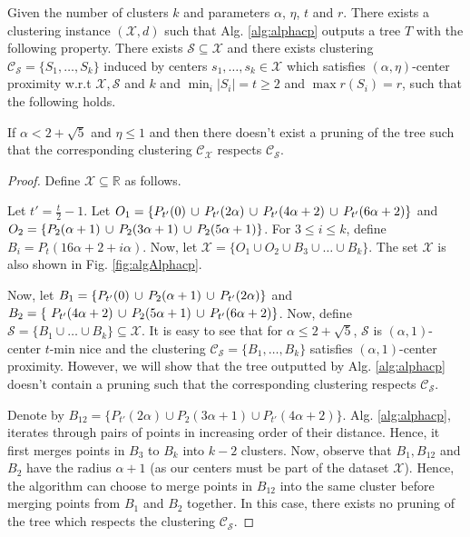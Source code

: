 \documentclass[anon,12pt]{colt2016} %
\newcommand{\mc}{\mathcal}
\begin{document}
\begin{theorem}
\label{thm:algAlphacp}
Given the number of clusters $k$ and parameters $\alpha$, $\eta$, $t$ and $r$. There exists a clustering instance $(\mc X, d)$ such that Alg. \ref{alg:alphacp} outputs a tree $T$ with the following property. There exists $\mc S \subseteq \mc X$ and there exists clustering $\mc C_{\mc S} = \{S_1, \ldots, S_k\}$ induced by centers $s_1, \ldots, s_k \in \mc X$ which satisfies $(\alpha, \eta)$-center proximity w.r.t $\mc X, \mc S$ and $k$ and $ \min_i|S_i| = t \ge 2$ and $\max r(S_i) = r$, such that the following holds. 

If $\alpha < 2 + \sqrt 5$ and $\eta \le 1$ and then there doesn't exist a pruning of the tree such that the corresponding clustering $\mc C_{\mc X}$ respects $\mc C_{\mc S}$.
\end{theorem}

\begin{proof}
Define $\mc X \subseteq \mathbb{R}$ as follows. 

Let $t' = \frac{t}{2}-1$. Let $O_1 = \{P_{t'}(0) \thinspace\cup\thinspace P_{t'}(2\alpha) \thinspace\cup\thinspace P_{t'}(4\alpha+2) \thinspace\cup\thinspace P_{t'}(6\alpha+2)\}$ and $O_2 = \{P_{2}(\alpha+1) \thinspace\cup\thinspace P_{2}(3\alpha+1) \thinspace\cup\thinspace P_{2}(5\alpha+1) \}$. For $3\le i\le k$, define $B_i = P_t (16\alpha+2+i \alpha )$. Now, let $\mc X = \{ O_1 \cup O_2 \cup B_3 \cup \ldots \cup B_k \}$. The set $\mc X$ is also shown in Fig. \ref{fig:algAlphacp}.

Now, let $B_1 = \{P_{t'}(0) \thinspace\cup\thinspace  P_{2}(\alpha+1) \thinspace\cup\thinspace P_{t'}(2\alpha) \}$ and $B_2 = \{\ P_{t'}(4\alpha+2) \thinspace\cup\thinspace P_{2}(5\alpha+1)\thinspace\cup\thinspace P_{t'}(6\alpha+2)\}$. Now, define $\mc S = \{B_1 \cup \ldots \cup B_k\} \subseteq \mc X$. It is easy to see that for $\alpha \le 2+\sqrt{5}$, $\mc S$ is $(\alpha, 1)$-center $t$-min nice and the clustering $\mc C_{\mc S} = \{B_1, \ldots, B_k\}$ satisfies $(\alpha, 1)$-center proximity. However, we will show that the tree outputted by Alg. \ref{alg:alphacp} doesn't contain a pruning such that the corresponding clustering respects $\mc C_{\mc S}$.

Denote by $B_{12} = \{P_{t'}(2\alpha) \cup P_{2}(3\alpha+1) \cup P_{t'}(4\alpha+2) \}$. Alg. \ref{alg:alphacp}, iterates through pairs of points in increasing order of their distance. Hence, it first merges points in $B_3$ to $B_k$ into $k-2$ clusters. Now, observe that $B_1, B_{12}$ and $B_{2}$ have the radius $\alpha + 1$ (as our centers must be part of the dataset $\mc X$). Hence, the algorithm can choose to merge points in $B_{12}$ into the same cluster before merging points from $B_1$ and $B_2$ together. In this case, there exists no pruning of the tree which respects the clustering $\mc C_{\mc S}$.
\end{proof}
\end{document}
